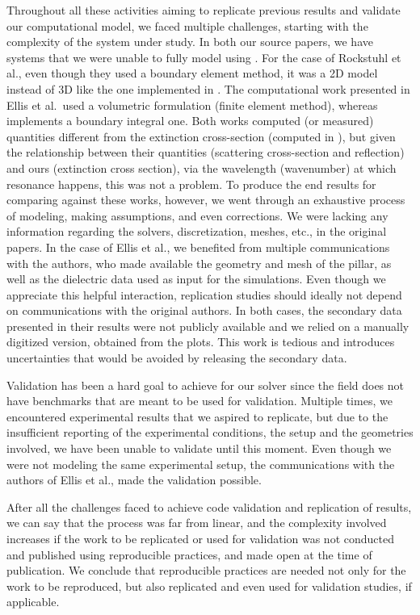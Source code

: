 
Throughout all these activities aiming to replicate previous results and validate our computational model, we faced multiple challenges, starting with the complexity of the system under study. In both our source papers, we have systems that we were unable to fully 
model using \pygbe. For the case of Rockstuhl et al., even though they used a boundary element method, it was a 2D model instead of 3D like the one implemented in \pygbe. The computational work presented in Ellis et al.\ used a volumetric 
formulation (finite element method), whereas \pygbe implements a boundary integral one. Both works computed (or measured) quantities different from the extinction cross-section (computed in \pygbe), but given the relationship between their quantities (scattering cross-section and reflection)  
and ours (extinction cross section), via the wavelength (wavenumber) at which resonance happens, this was not a problem. To produce the end results for comparing against these works, however, we went through an 
exhaustive process of modeling, making assumptions, and even corrections. We were lacking any information regarding the solvers, discretization, meshes, etc., in the original papers. In the case of Ellis et al., we benefited from multiple communications with the authors, 
who made available the geometry and mesh of the pillar, as well as the dielectric data used as input for the simulations. Even though we appreciate this helpful interaction, replication studies should ideally not depend on communications with the original authors. 
In both cases, the secondary data presented in their results were not publicly available and we relied on a manually digitized version, obtained from the plots. This work is tedious and introduces uncertainties that would be avoided by releasing 
the secondary data.

Validation has been a hard goal to achieve for our solver since the field does not have benchmarks that are meant to be used for validation. Multiple times,
we encountered experimental results that we aspired to replicate, but due to the insufficient reporting of the experimental conditions, the setup and the geometries involved, 
we have been unable to validate until this moment. Even though we were not modeling the same experimental setup, the communications with the authors of Ellis et al., made 
the validation possible.

After all the challenges faced to achieve code validation and replication of results, we can say that the process was far from  linear, 
and the complexity involved increases if the work to be replicated or used for validation was not conducted and published using reproducible practices, and made open at the time 
of publication. We conclude that reproducible practices are needed not only for the work to be reproduced, but also 
replicated and even used for validation studies, if applicable.

